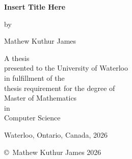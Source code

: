 \pagestyle{empty}

\begin{titlepage}
        \begin{center}
        \vspace*{1.0cm}

        \Huge
        {\bf Insert Title Here }

        \vspace*{1.0cm}

        \normalsize
        by \\

        \vspace*{1.0cm}

        \Large
        Mathew Kuthur James \\

        \vspace*{3.0cm}

        \normalsize
        A thesis \\
        presented to the University of Waterloo \\ 
        in fulfillment of the \\
        thesis requirement for the degree of \\
        Master of Mathematics \\
        in \\
        Computer Science \\

        \vspace*{2.0cm}

        Waterloo, Ontario, Canada, 2026 \\

        \vspace*{1.0cm}

        \copyright\ Mathew Kuthur James 2026 \\
        \end{center}
\end{titlepage}

\pagestyle{plain}
\setcounter{page}{2}


